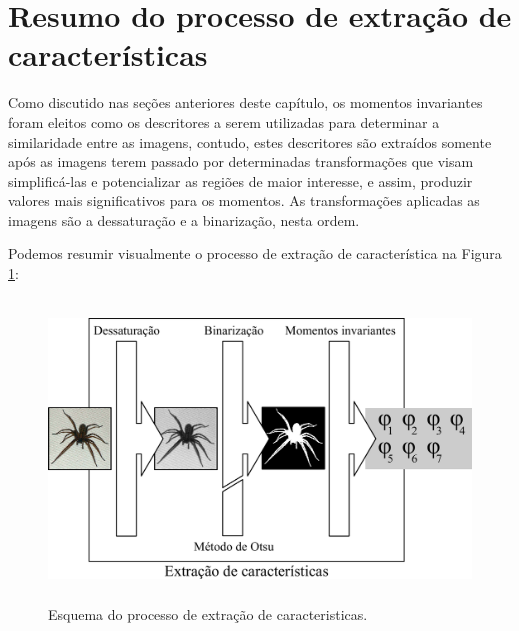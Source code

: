 \section{Resumo do processo de extração de características}
\label{sec:resumo_extracao_caracteristicas}

Como discutido nas seções anteriores deste capítulo, os momentos invariantes
foram eleitos como os descritores a serem utilizadas para determinar a
similaridade entre as imagens, contudo, estes descritores são extraídos somente
após as imagens terem passado por determinadas transformações que visam
simplificá-las e potencializar as regiões de maior interesse, e assim, produzir
valores mais significativos para os momentos. As transformações  aplicadas as
imagens são a dessaturação e a binarização, nesta ordem.

Podemos resumir visualmente o processo de extração de característica na
Figura \ref{fig:extracao_caracteristicas}:

\begin{figure}[H]
  \begin{center}
    \includegraphics[height=8cm]{imagens/extracao_caracteristicas.pdf}
  \end{center}
  \caption{ Esquema do processo de extração de caracteristicas. }
  \label{fig:extracao_caracteristicas}
\end{figure}
